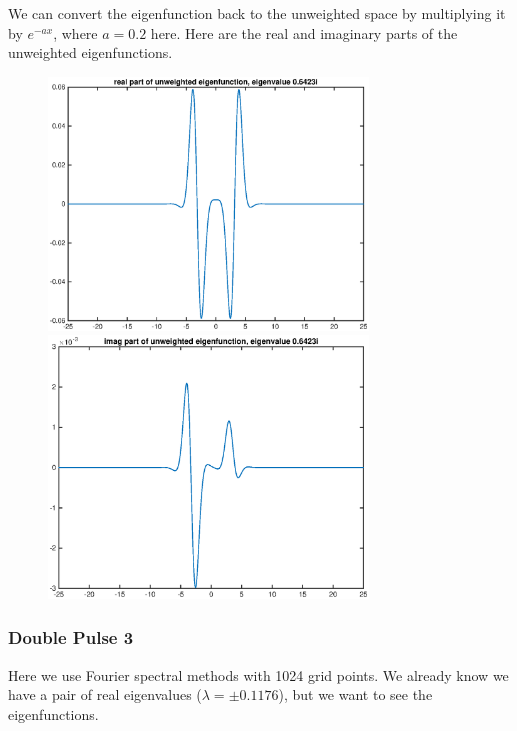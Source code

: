 \documentclass[12pt]{article}
\begin{document}
We can convert the eigenfunction back to the unweighted space by multiplying it by $e^{-ax}$, where $a = 0.2$ here. Here are the real and imaginary parts of the unweighted eigenfunctions.
\begin{figure}[H]
\includegraphics[width=8.5cm]{1double2eigenfnrealunweighted}
\includegraphics[width=8.5cm]{1double2eigenfnimagunweighted}
\end{figure}

\subsubsection*{Double Pulse 3}
Here we use Fourier spectral methods with 1024 grid points. We already know we have a pair of real eigenvalues ($\lambda = \pm 0.1176$), but we want to see the eigenfunctions.
\end{document}
